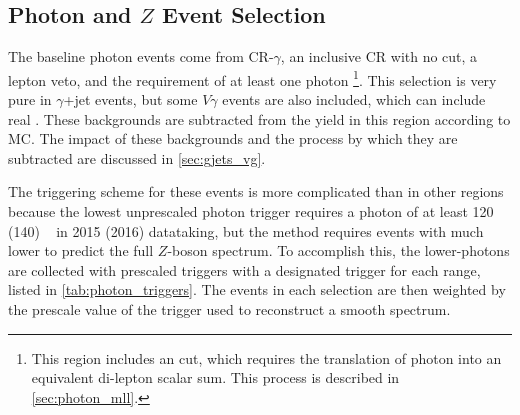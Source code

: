 \subsection{Photon and $Z$ Event Selection}
\label{sec:photon_eventsel}

The baseline photon events come from CR-$\gamma$, an inclusive \ac{CR} with no \met cut, a lepton veto, and the requirement of at least one photon \footnote{This region includes an \HT cut, which requires the translation of photon \pt into an equivalent di-lepton \pt scalar sum. This process is described in \autoref{sec:photon_mll}.}. This selection is very pure in $\gamma$+jet events, but some $V\gamma$ events are also included, which can include real \met. These backgrounds are subtracted from the yield in this region according to \ac{MC}. The impact of these backgrounds and the process by which they are subtracted are discussed in \autoref{sec:gjets_vg}. 

The triggering scheme for these \gjets events is more complicated than in other regions because the lowest unprescaled photon trigger requires a photon \pt of at least 120 (140) \gev~ in 2015 (2016) datataking, but the method requires events with much lower \pt to predict the full $Z$-boson \pt spectrum. To accomplish this, the lower-\pt photons are collected with prescaled triggers with a designated trigger for each \pt range, listed in \autoref{tab:photon_triggers}. The events in each selection are then weighted by the prescale value of the trigger used to reconstruct a smooth \pt spectrum. 

